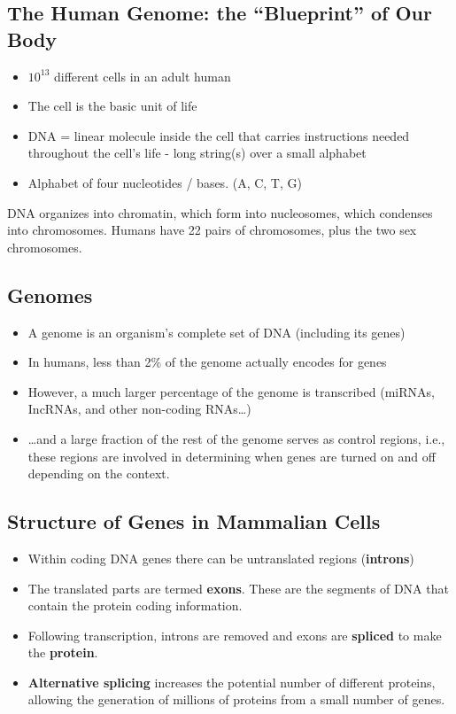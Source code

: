 \documentclass[10pt]{article}
\begin{document}
\subsection*{The Human Genome: the ``Blueprint'' of Our Body}
\begin{itemize}
    \item $10^{13}$ different cells in an adult human
    \item The cell is the basic unit of life
    \item DNA = linear molecule inside the cell that carries instructions needed throughout the cell's life - long string(s) over a small alphabet
    \item Alphabet of four nucleotides / bases.  (A, C, T, G)
\end{itemize}
DNA organizes into chromatin, which form into nucleosomes, which condenses into chromosomes.  Humans have 22 pairs of chromosomes, plus the two sex chromosomes.

\subsection*{Genomes}
\begin{itemize}
    \item A genome is an organism's complete set of DNA (including its genes)
    \item In humans, less than 2\% of the genome actually encodes for genes
    \item However, a much larger percentage of the genome is transcribed (miRNAs, IncRNAs, and other non-coding RNAs\dots)
    \item \dots and a large fraction of the rest of the genome serves as control regions, i.e., these regions are involved in determining when genes are turned on and off depending on the context.
\end{itemize}

\subsection*{Structure of Genes in Mammalian Cells}
\begin{itemize}
	\item Within coding DNA genes there can be untranslated regions (\textbf{introns})
	\item The translated parts are termed \textbf{exons}.  These are the segments of DNA that contain the protein coding information.
	\item Following transcription, introns are removed and exons are \textbf{spliced} to make the \textbf{protein}.
	\item \textbf{Alternative splicing} increases the potential number of different proteins, allowing the generation of millions of proteins from a small number of genes.
\end{itemize}
\end{document}
